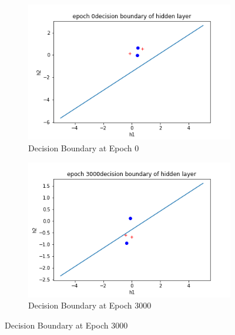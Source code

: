 \documentclass{article}
\begin{document}
\begin{enumerate}
\begin{figure}[H]
     	\centering
     	\begin{subfigure}[b]{0.45\textwidth}
         	\centering
         	\includegraphics[width=\textwidth]
         	{epoch 0 decision boundary of hidden layer.png}
         	\caption{Decision Boundary at Epoch 0}
         	\label{fig:Hyperplane Epoch 0}
     	\end{subfigure}
     	\hfill
     	\begin{subfigure}[b]{0.45\textwidth}
         	\centering
         	\includegraphics[width=\textwidth]
         	{epoch 3000 decision boundary of hidden layer.png}
         	\caption{Decision Boundary at Epoch 3000}
         	\label{fig:Hyperplane Epoch 1000}
     	\end{subfigure}
     	\end{figure}
     	

\end{enumerate}
\end{document}
